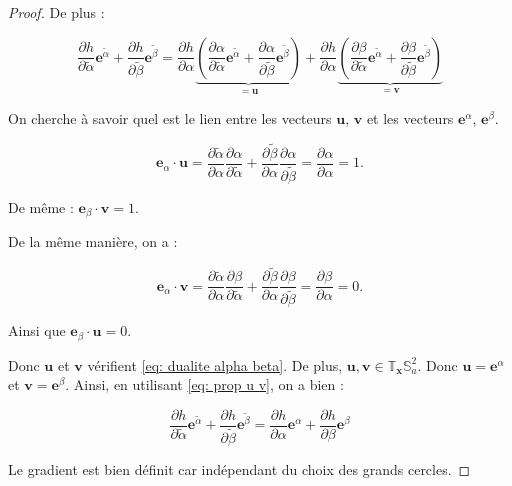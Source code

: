 \begin{proof}
De plus :

\begin{equation}
\dfrac{\partial h}{\partial \tilde{\alpha}} \mathbf{e}^{\tilde{\alpha}} + \dfrac{\partial h}{\partial \tilde{\beta}} \mathbf{e}^{\tilde{\beta}} = \dfrac{\partial h}{\partial \alpha}  \underbrace{\left( \dfrac{\partial \alpha}{\partial \tilde{\alpha}} \mathbf{e}^{\tilde{\alpha}} + \dfrac{\partial \alpha}{\partial \tilde{\beta}} \mathbf{e}^{\tilde{\beta}}  \right)} _{=\mathbf{u}} + \dfrac{\partial h}{\partial \alpha}  \underbrace{\left( \dfrac{\partial \beta}{\partial \tilde{\alpha}} \mathbf{e}^{\tilde{\alpha}} + \dfrac{\partial \beta}{\partial \tilde{\beta}} \mathbf{e}^{\tilde{\beta}} \right)}_{= \mathbf{v}} 
\label{eq: prop u v}
\end{equation}

On cherche à savoir quel est le lien entre les vecteurs $\mathbf{u}$, $\mathbf{v}$ et les vecteurs $\mathbf{e}^{\alpha}$, $\mathbf{e}^{\beta}$.

\begin{equation}
\mathbf{e}_{\alpha} \cdot \mathbf{u} = \dfrac{\partial \tilde{\alpha}}{\partial \alpha} \dfrac{\partial \alpha}{\partial \tilde{\alpha}} + \dfrac{\partial \tilde{\beta}}{\partial \alpha} \dfrac{\partial \alpha}{\partial \tilde{\beta}} = \dfrac{\partial \alpha}{\partial \alpha} = 1.
\end{equation}

De même : $\mathbf{e}_{\beta} \cdot \mathbf{v} = 1$.

De la même manière, on a :

\begin{equation}
\mathbf{e}_{\alpha} \cdot \mathbf{v} = \dfrac{\partial \tilde{\alpha}}{\partial \alpha} \dfrac{\partial \beta}{\partial \tilde{\alpha}} + \dfrac{\partial \tilde{\beta}}{\partial \alpha} \dfrac{\partial \beta}{\partial \tilde{\beta}} = \dfrac{\partial \beta}{\partial \alpha} = 0.
\end{equation}

Ainsi que $\mathbf{e}_{\beta} \cdot \mathbf{u} = 0$.

Donc $\mathbf{u}$ et $\mathbf{v}$ vérifient \eqref{eq: dualite alpha beta}. De plus, $\mathbf{u}, \mathbf{v} \in \mathbb{T}_{\mathbf{x}} \mathbb{S}_a^2$. Donc $\mathbf{u} = \mathbf{e}^{\alpha}$ et $\mathbf{v} = \mathbf{e}^{\beta}$. Ainsi, en utilisant \eqref{eq: prop u v}, on a bien :

\begin{equation}
\dfrac{\partial h}{\partial \tilde{\alpha}} \mathbf{e}^{\tilde{\alpha}} + \dfrac{\partial h}{\partial \tilde{\beta}} \mathbf{e}^{\tilde{\beta}} = \dfrac{\partial h}{\partial \alpha} \mathbf{e}^{\alpha} + \dfrac{\partial h}{\partial \beta} \mathbf{e}^{\beta}
\end{equation}

Le gradient est bien définit car indépendant du choix des grands cercles.
\end{proof}


